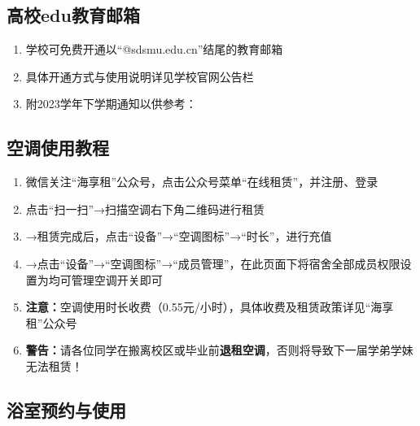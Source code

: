 \subsection[高校edu教育邮箱]{高校edu教育邮箱}
\label{email}
\begin{enumerate}
    \item 学校可免费开通以“@sdsmu.edu.cn”结尾的教育邮箱
    \item 具体开通方式与使用说明详见学校官网公告栏
    \item 附2023学年下学期通知以供参考：
\end{enumerate}

\subsection[空调使用教程]{空调使用教程}
\label{air_control}
\begin{enumerate}
    \item 微信关注“海享租”公众号，点击公众号菜单“在线租赁”，并注册、登录
    \item 点击“扫一扫”→扫描空调右下角二维码进行租赁\footnotemark
    \item →租赁完成后，点击“设备”→“空调图标”→“时长”，进行充值
    \item →点击“设备”→“空调图标”→“成员管理”，在此页面下将宿舍全部成员权限设置为均可管理空调开关即可
    \item \textbf{注意：}空调使用时长收费（0.55元/小时），具体收费及租赁政策详见“海享租”公众号
    \item \textbf{警告：}请各位同学在搬离校区或毕业前\textbf{退租空调}，否则将导致下一届学弟学妹无法租赁！
\end{enumerate}

\subsection[浴室预约与使用]{浴室预约与使用}
